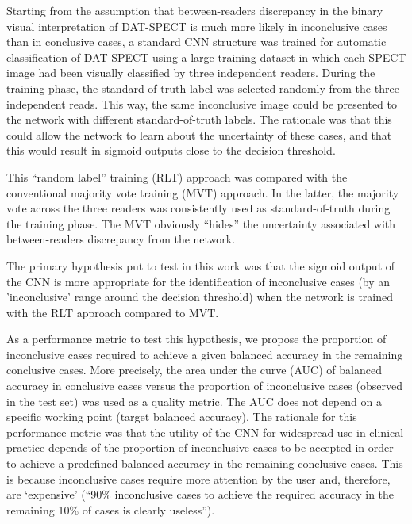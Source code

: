 Starting from the assumption that between-readers discrepancy in the binary visual interpretation of DAT-SPECT is much more likely in inconclusive cases 
than in conclusive cases, a standard CNN structure was trained for automatic classification of DAT-SPECT using a large training dataset in which each 
SPECT image had been visually classified by three independent readers. 
During the training phase, the standard-of-truth label was selected randomly 
from the three independent reads. 
This way, the same inconclusive image could be presented to the network with different standard-of-truth labels. 
The rationale was that this could allow the network to learn about the uncertainty of these cases, 
and that this would result in sigmoid outputs close to the decision threshold.

This “random label” training (RLT) approach was compared with the conventional majority vote training (MVT) approach. 
In the latter,  the majority vote across the three readers was consistently used as standard-of-truth during the training phase. 
The MVT obviously “hides” the uncertainty associated with between-readers discrepancy from the network. 

The primary hypothesis put to test in this work was that the sigmoid output of the CNN is more appropriate for the identification of inconclusive cases 
(by an 'inconclusive' range around the decision threshold) when the network is trained with the RLT approach compared to MVT.

As a performance metric to test this hypothesis, we propose the proportion of inconclusive cases required to achieve a given balanced accuracy in the 
remaining conclusive cases. More precisely, the area under the curve (AUC) of balanced accuracy in conclusive cases versus the proportion of 
inconclusive cases (observed in the test set) was used as a quality metric. 
The AUC does not depend on a specific working point (target balanced accuracy).  
The rationale for this performance metric was that the utility of the CNN for widespread use in clinical practice depends of the proportion of 
inconclusive cases to be accepted in order to achieve a predefined balanced accuracy in the remaining conclusive cases. 
This is because inconclusive cases require more attention by the user and, therefore, are ‘expensive’ 
(“90\% inconclusive cases to achieve the required accuracy in the remaining 10\% of cases is clearly useless”). 

